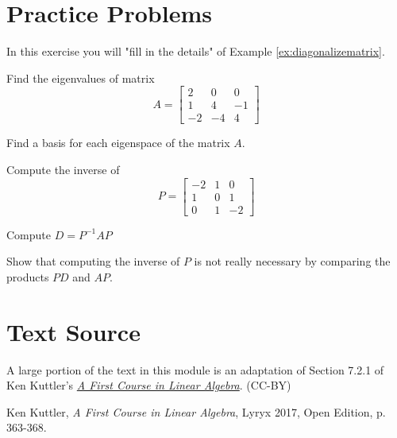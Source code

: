 \documentclass{ximera}
\begin{document}
\section*{Practice Problems}
\begin{problem}
In this exercise you will "fill in the details" of Example \ref{ex:diagonalizematrix}.
\begin{problem}\label{prob:ex:diagonalizematrix1}
Find the eigenvalues of matrix 
\begin{equation*}
A=\begin{bmatrix}
2 & 0 & 0 \\
1 & 4 & -1 \\
-2 & -4 & 4
\end{bmatrix}
\end{equation*}
\end{problem} 
\begin{problem}\label{prob:ex:diagonalizematrix2}
Find a basis for each eigenspace of the matrix $A$.
\end{problem}
\begin{problem}\label{prob:ex:diagonalizematrix3}
Compute the inverse of \begin{equation*}
P=
\begin{bmatrix}
-2 & 1 & 0 \\
1 & 0 & 1 \\
0 & 1 & -2
\end{bmatrix}
\end{equation*}
\end{problem}
\begin{problem}\label{prob:ex:diagonalizematrix5}
Compute $D=P^{-1}AP$
\end{problem}
\begin{problem}\label{prob:ex:diagonalizematrix4}
Show that computing the inverse of $P$ is not really necessary by comparing the products  $PD$ and $AP$.
\end{problem}
  \end{problem}
  
\section*{Text Source}
A large portion of the text in this module is an adaptation of Section 7.2.1 of Ken Kuttler's \href{https://open.umn.edu/opentextbooks/textbooks/a-first-course-in-linear-algebra-2017}{\it A First Course in Linear Algebra}. (CC-BY)

Ken Kuttler, {\it  A First Course in Linear Algebra}, Lyryx 2017, Open Edition, p. 363-368.  
\end{document}
